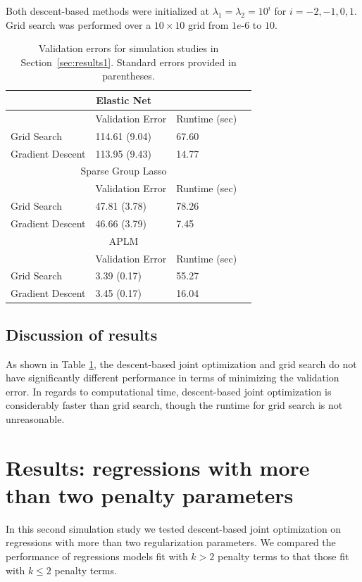 \documentclass{statsoc}
\begin{document}
Both descent-based methods were initialized at $\lambda_1 = \lambda_2 = 10^i$ for $i=-2, -1, 0, 1$. Grid search was performed over a $10 \times 10$ grid from $1e\text{-}6$ to $10$.
\begin{table}
\caption{\label{table:validation} Validation errors for simulation studies in Section~\ref{sec:results1}. Standard errors provided in parentheses.}
\centering
\begin{tabular}{| l | l | l | l | }
\hline
\multicolumn{3}{|c|}{Elastic Net}\\
\hline
 & Validation Error & Runtime (sec) \\
\hline
Grid Search & 114.61 (9.04) & 67.60\\
\hline
Gradient Descent & 113.95 (9.43) & 14.77\\
\hline
\multicolumn{3}{|c|}{Sparse Group Lasso}\\
\hline
 & Validation Error & Runtime (sec) \\
\hline
Grid Search & 47.81 (3.78) & 78.26 \\
\hline
Gradient Descent  & 46.66 (3.79) & 7.45 \\
\hline
\multicolumn{3}{|c|}{APLM}\\
\hline
 & Validation Error & Runtime (sec) \\
\hline
Grid Search  & 3.39 (0.17) & 55.27 \\
\hline
Gradient Descent  & 3.45 (0.17) & 16.04 \\
\hline
\end{tabular}
\end{table}

\subsection{Discussion of results}
As shown in Table \ref{table:validation}, the descent-based joint optimization and grid search do not have significantly different performance in terms of minimizing the validation error. In regards to computational time, descent-based joint optimization is considerably faster than grid search, though the runtime for grid search is not unreasonable.

\section{Results: regressions with more than two penalty parameters}\label{results2}

In this second simulation study we tested descent-based joint optimization on regressions with more than two regularization parameters. We compared the performance of regressions models fit with $k>2$ penalty terms to that those fit with $k \le 2$ penalty terms.
\end{document}
